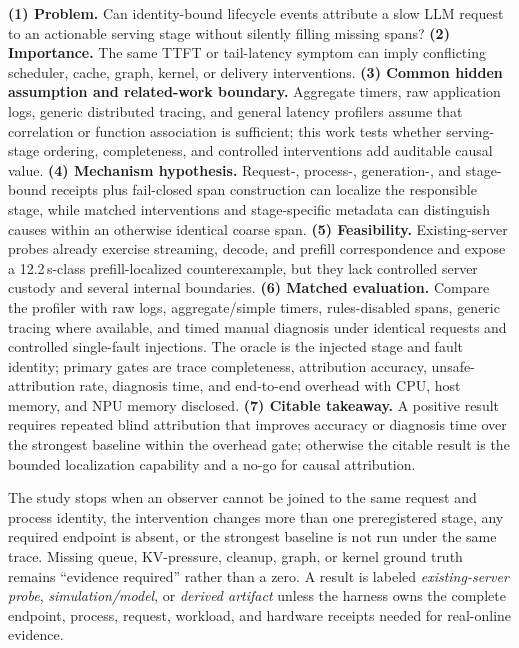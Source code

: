 \documentclass[sigconf,screen,nonacm]{acmart}
\begin{document}
\textbf{(1) Problem.} Can identity-bound lifecycle events attribute a slow LLM
request to an actionable serving stage without silently filling missing spans?
\textbf{(2) Importance.} The same TTFT or tail-latency symptom can imply
conflicting scheduler, cache, graph, kernel, or delivery interventions.
\textbf{(3) Common hidden assumption and related-work boundary.} Aggregate
timers, raw application logs, generic distributed tracing, and general latency
profilers assume that correlation or function association is sufficient; this
work tests whether serving-stage ordering, completeness, and controlled
interventions add auditable causal value. \textbf{(4) Mechanism hypothesis.}
Request-, process-, generation-, and stage-bound receipts plus fail-closed
span construction can localize the responsible stage, while matched
interventions and stage-specific metadata can distinguish causes within an
otherwise identical coarse span. \textbf{(5) Feasibility.} Existing-server
probes already exercise streaming, decode, and prefill correspondence and expose
a 12.2\,s-class prefill-localized counterexample, but they lack controlled
server custody and several internal boundaries. \textbf{(6) Matched
evaluation.} Compare the profiler with raw logs, aggregate/simple timers,
rules-disabled spans, generic tracing where available, and timed manual
diagnosis under identical requests and controlled single-fault injections.
The oracle is the injected stage and fault identity; primary gates are trace
completeness, attribution accuracy, unsafe-attribution rate, diagnosis time,
and end-to-end overhead with CPU, host memory, and NPU memory disclosed.
\textbf{(7) Citable takeaway.} A positive result requires repeated blind
attribution that improves accuracy or diagnosis time over the strongest
baseline within the overhead gate; otherwise the citable result is the bounded
localization capability and a no-go for causal attribution.

The study stops when an observer cannot be joined to the same request and
process identity, the intervention changes more than one preregistered stage,
any required endpoint is absent, or the strongest baseline is not run under the
same trace. Missing queue, KV-pressure, cleanup, graph, or kernel ground truth
remains ``evidence required'' rather than a zero. A result is labeled
\emph{existing-server probe}, \emph{simulation/model}, or
\emph{derived artifact} unless the harness owns the complete endpoint, process,
request, workload, and hardware receipts needed for real-online evidence.
\end{document}
